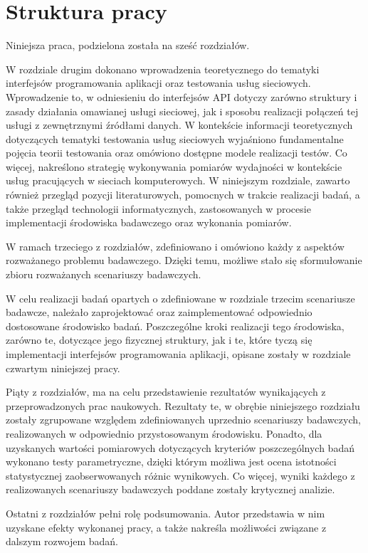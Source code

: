 \section{Struktura pracy}
Niniejsza praca, podzielona została na sześć rozdziałów.

W rozdziale drugim dokonano wprowadzenia teoretycznego do tematyki interfejsów programowania aplikacji oraz testowania usług sieciowych. Wprowadzenie to, w odniesieniu do interfejsów API dotyczy zarówno struktury i zasady działania omawianej usługi sieciowej, jak i sposobu realizacji połączeń tej usługi z zewnętrznymi źródłami danych. W kontekście informacji teoretycznych dotyczących tematyki testowania usług sieciowych wyjaśniono fundamentalne pojęcia teorii testowania oraz omówiono dostępne modele realizacji testów. Co więcej, nakreślono strategię wykonywania pomiarów wydajności w kontekście usług pracujących w sieciach komputerowych. W niniejszym rozdziale, zawarto również przegląd pozycji literaturowych, pomocnych w trakcie realizacji badań, a także przegląd technologii informatycznych, zastosowanych w procesie implementacji środowiska badawczego oraz wykonania pomiarów.

W ramach trzeciego z rozdziałów, zdefiniowano i omówiono każdy z aspektów rozważanego problemu badawczego. Dzięki temu, możliwe stało się sformułowanie zbioru rozważanych scenariuszy badawczych.

W celu realizacji badań opartych o zdefiniowane w rozdziale trzecim scenariusze badawcze, należało zaprojektować oraz zaimplementować odpowiednio dostosowane środowisko badań. Poszczególne kroki realizacji tego środowiska, zarówno te, dotyczące jego fizycznej struktury, jak i te, które tyczą się implementacji interfejsów programowania aplikacji, opisane zostały w rozdziale czwartym niniejszej pracy. 

Piąty z rozdziałów, ma na celu przedstawienie rezultatów wynikających z przeprowadzonych prac naukowych. Rezultaty te, w obrębie niniejszego rozdziału zostały zgrupowane względem zdefiniowanych uprzednio scenariuszy badawczych, realizowanych w odpowiednio przystosowanym środowisku. Ponadto, dla uzyskanych wartości pomiarowych dotyczących kryteriów poszczególnych badań wykonano testy parametryczne, dzięki którym możliwa jest ocena istotności statystycznej zaobserwowanych różnic wynikowych. Co więcej, wyniki każdego z realizowanych scenariuszy badawczych poddane zostały krytycznej analizie.

Ostatni z rozdziałów pełni rolę podsumowania. Autor przedstawia w nim uzyskane efekty wykonanej pracy, a także nakreśla możliwości związane z dalszym rozwojem badań.
